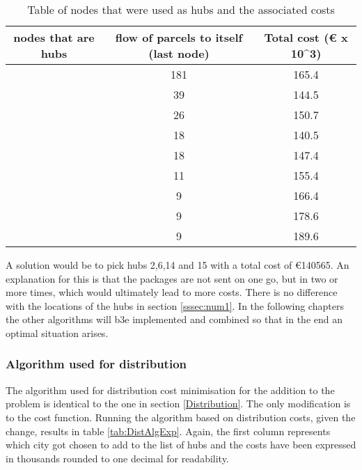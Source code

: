 \documentclass{article}
\begin{document}
            \begin{table}[h!]
            \begin{tabular}{||c|c|c||}
            \hline
            nodes that are hubs & flow of parcels to itself (last node) & Total cost (€ x 10^3) \\
            \hline
            \hline
            [14] &  181 & 165.4 \\
            \hline
            [14,2]   & 39 & 144.5 \\
            \hline
            [14,2,15] & 26 & 150.7 \\
            \hline
            [14,2,15,6]  & 18 & 140.5 \\
            \hline
            [14,2,15,6,13] & 18 & 147.4\\
            \hline
            [14,2,15,6,13,4] & 11 & 155.4   \\
            \hline
            [14,2,15,6,13,4,3] & 9 & 166.4   \\
            \hline
            [14,2,15,6,13,4,3,9] & 9 & 178.6    \\
            \hline
            [14,2,15,6,13,4,3,9,7] & 9 & 189.6    \\
            \hline
            \end{tabular}
            \caption{Table of nodes that were used as hubs and the associated costs}
            \end{table}

A solution would be to pick hubs 2,6,14 and 15 with a total cost of €140565. An explanation for this is that the packages are not sent on one go, but in two or more times, which would ultimately lead to more costs. There is no difference with the locations of the hubs in section \ref{sssec:num1}. In the following chapters the other algorithms will b3e implemented and combined so that in the end an optimal situation arises.

\subsubsection{Algorithm used for distribution}
The algorithm used for distribution cost minimisation for the addition to the problem is identical to the one in section \ref{Distribution}. The only modification is to the cost function. Running the algorithm based on distribution costs, given the change, results in table \ref{tab:DistAlgExp}. Again, the first column represents which city got chosen to add to the list of hubs and the costs have been expressed in thousands rounded to one decimal for readability.
\end{document}
